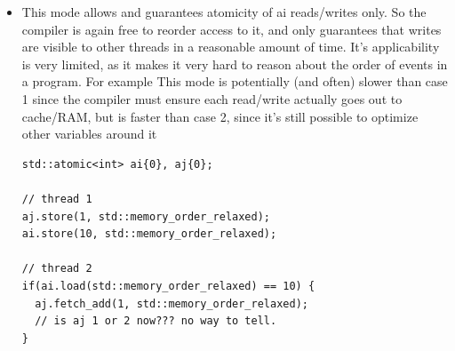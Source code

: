 \documentclass[a4paper,11pt,twoside]{book}
\begin{document}
\begin{itemize}
    \item This mode allows and guarantees atomicity of ai reads/writes only. So the compiler is again free to reorder access to it, and only guarantees that writes are visible to other threads in a reasonable amount of time. It's applicability is very limited, as it makes it very hard to reason about the order of events in a program. For example This mode is potentially (and often) slower than case 1 since the compiler must ensure each read/write actually goes out to cache/RAM, but is faster than case 2, since it's still possible to optimize other variables around it
\begin{lstlisting}[]
std::atomic<int> ai{0}, aj{0}; 
 
// thread 1 
aj.store(1, std::memory_order_relaxed); 
ai.store(10, std::memory_order_relaxed); 
 
// thread 2 
if(ai.load(std::memory_order_relaxed) == 10) { 
  aj.fetch_add(1, std::memory_order_relaxed); 
  // is aj 1 or 2 now??? no way to tell. 
} 
\end{lstlisting}
\end{itemize}
\end{document}
